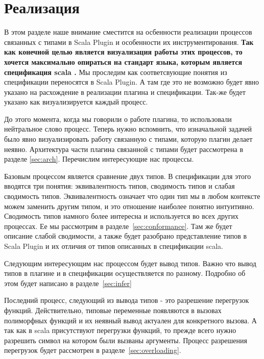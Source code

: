 \section{Реализация}
\label{sec:implementation}

В этом разделе наше внимание сместится на осбенности реализации процессов
связанных с типами в Scala Plugin и особенности их инструментирования.
\textbf{Так как конечной целью является визуализация работы этих процессов, то
хочется максимально опираться на стандарт языка, которым является спецификация
scala \cite{scala_spec}.}
Мы проследим как соответсвующие понятия из спецификации переносятся в Scala Plugin.
А там где это не возможно будет явно указано на расхождение в реализации плагина и
спецификации.
Так-же будет указано как визуализируется каждый процесс.


До этого момента, когда мы говорили о работе плагина, то использовали
нейтральное слово процесс.
Теперь нужно вспомнить, что изначальной задачей было явно визуализировать
работу связанную с типами, которую плагин делает неявно.
Архитектура части плагина связанной с типами будет
рассмотрена в разделе \ref{sec:arch}.
Перечислим интересующие нас процессы.

Базовым процессом является сравнение двух типов.
В спецификации для этого вводятся три понятия: эквивалентность типов, сводимость
типов и слабая сводимость типов.
Эквивалентность означает что один тип мы в любом контексте можем заменить другим
типом, и это отношение наиболее понятно интуитивно.
Сводимость типов намного более интересна и используется во всех других процессах.
Ее мы рассмотрим в разделе~\ref{sec:conformance}.
Там же будет описание слабой сводимости, а также будет разобрано представление
типов в Scala Plugin и их отличия от типов описанных в спецификации scala.

Следующим интересующим нас процессом будет вывод типов.
Важно что вывод типов в плагине и в спецификации осуществляется по разному.
Подробно об этом будет написано в разделе~\ref{sec:infer}

Последний процесс, следующий из вывода типов - это разрешение перегрузок функций.
Действительно, типовые переменные появляются в вызовах полиморфных
функций и их неявный вывод актуален для конкретного вызова.
А так как в scala присутствуют перегрузки функций, то прежде всего нужно
разрешить символ на котором были вызваны аргументы.
Процесс разрешения перегрузок будет рассмотрен в разделе~\ref{sec:overloading}.

